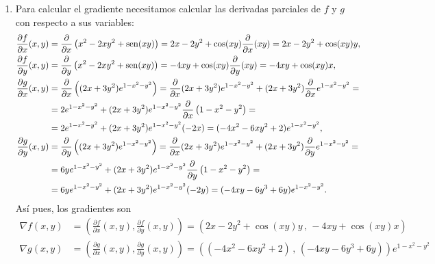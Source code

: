 {\begin{enumerate}
\item Para calcular el gradiente necesitamos calcular las derivadas parciales de $f$ y $g$ con respecto a sus variables:
\begin{align*}
\frac{\partial f}{\partial x}(x,y) &= \frac{\partial}{\partial
x}\left(x^2- 2xy^2+\operatorname{sen}(xy)\right)=
2x-2y^2+\cos(xy)\frac{\partial}{\partial x}(xy)=2x-2y^2+\cos(xy)y,\\
\frac{\partial f}{\partial y}(x,y) &= \frac{\partial}{\partial
y}\left(x^2- 2xy^2+\operatorname{sen}(xy)\right)=
-4xy+\cos(xy)\frac{\partial}{\partial y}(xy)=-4xy+\cos(xy)x,\\
\frac{\partial g}{\partial x}(x,y) &= \frac{\partial}{\partial x}\left((2x+3y^2)e^{1-x^2-y^2}\right)=
\frac{\partial}{\partial x}(2x+3y^2)e^{1-x^2-y^2}+(2x+3y^2)\frac{\partial}{\partial x}e^{1-x^2-y^2}=\\
&= 2e^{1-x^2-y^2}+(2x+3y^2)e^{1-x^2-y^2}\frac{\partial}{\partial x}\left(1-x^2-y^2\right) = \\
&= 2e^{1-x^2-y^2}+(2x+3y^2)e^{1-x^2-y^2}(-2x)= (-4x^2-6xy^2+2)e^{1-x^2-y^2},\\
\frac{\partial g}{\partial y}(x,y) &= \frac{\partial}{\partial y}\left((2x+3y^2)e^{1-x^2-y^2}\right)=
\frac{\partial}{\partial x}(2x+3y^2)e^{1-x^2-y^2}+(2x+3y^2)\frac{\partial}{\partial y}e^{1-x^2-y^2}=\\
&= 6y e^{1-x^2-y^2}+(2x+3y^2)e^{1-x^2-y^2}\frac{\partial}{\partial y}\left(1-x^2-y^2\right) =\\
&=6ye^{1-x^2-y^2}+(2x+3y^2)e^{1-x^2-y^2}(-2y)= (-4xy-6y^3+6y)e^{1-x^2-y^2}.
\end{align*}
Así pues, los gradientes son
\begin{align*}
\nabla f(x,y) &=\left(\frac{\partial f}{\partial x}(x,y),\frac{\partial
f}{\partial y}(x,y)\right) = \left(2x-2y^2+\cos(xy)y\, ,\, -4xy+\cos(xy)x\right) \\
\nabla g(x,y) &=\left(\frac{\partial g}{\partial x}(x,y),\frac{\partial
g}{\partial y}(x,y)\right) = \left((-4x^2-6xy^2+2)\, ,\, (-4xy-6y^3+6y)\right)e^{1-x^2-y^2}
\end{align*}


\end{enumerate}}
